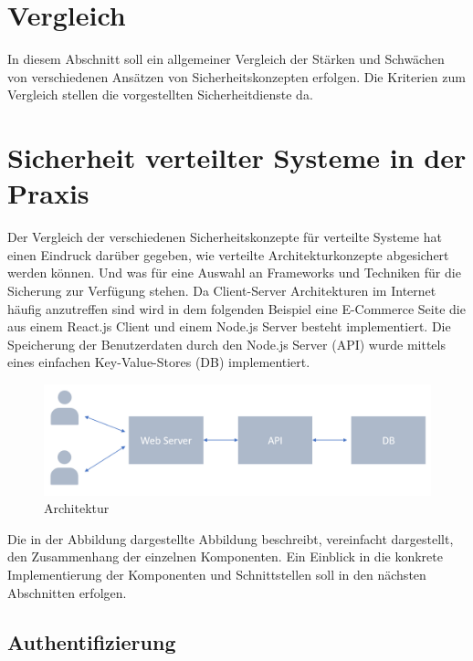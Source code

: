\documentclass[utf8,biblatex]{lni}
\begin{document}
\section{Vergleich}

In diesem Abschnitt soll ein allgemeiner Vergleich der 
Stärken und Schwächen von verschiedenen Ansätzen von Sicherheitskonzepten erfolgen. 
Die Kriterien zum Vergleich stellen die vorgestellten Sicherheitdienste da. 


\section{Sicherheit verteilter Systeme in der Praxis}

Der Vergleich der verschiedenen Sicherheitskonzepte für verteilte Systeme hat einen Eindruck darüber gegeben, wie 
verteilte Architekturkonzepte abgesichert werden können. Und was für eine Auswahl an Frameworks und Techniken für die Sicherung zur Verfügung stehen.
Da Client-Server Architekturen im Internet häufig anzutreffen sind wird in dem folgenden Beispiel eine E-Commerce Seite die aus einem React.js Client und 
einem Node.js Server besteht implementiert. 
Die Speicherung der Benutzerdaten durch den Node.js Server (API) wurde mittels eines einfachen Key-Value-Stores (DB) implementiert. 

\begin{figure}
  \centering
  \includegraphics[width=\textwidth]{images/architektur.png}
  \caption[Architektur]{Architektur} 
  \label{Architektur}
\end{figure} 

Die in der Abbildung dargestellte Abbildung beschreibt, vereinfacht dargestellt, den Zusammenhang der einzelnen Komponenten. 
Ein Einblick in die konkrete Implementierung der Komponenten und Schnittstellen soll in den nächsten Abschnitten erfolgen. 

\subsection{Authentifizierung}
\end{document}
